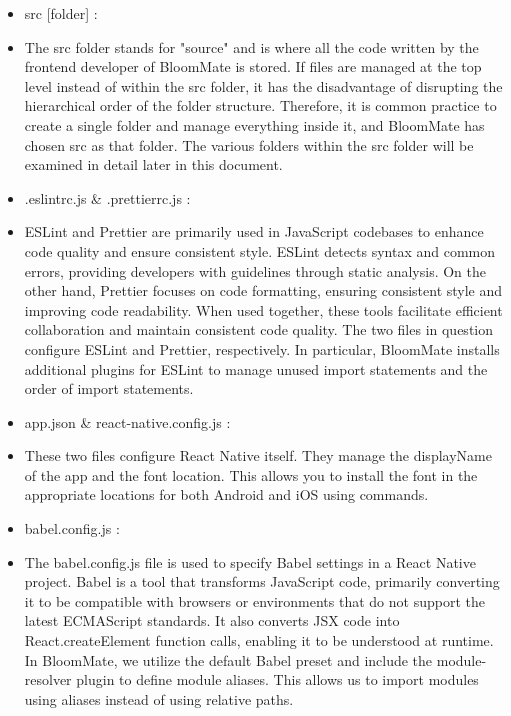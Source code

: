 \documentclass[conference, a4paper]{IEEEtran}
\begin{document}
\begin{enumerate}
\begin{enumerate}
\begin{itemize}
            \item src [folder] :
            \item[] The src folder stands for "source" and is where all the code written by the frontend developer of BloomMate is stored. If files are managed at the top level instead of within the src folder, it has the disadvantage of disrupting the hierarchical order of the folder structure. Therefore, it is common practice to create a single folder and manage everything inside it, and BloomMate has chosen src as that folder. The various folders within the src folder will be examined in detail later in this document. \\

            \item .eslintrc.js \& .prettierrc.js : 
            \item[]  ESLint and Prettier are primarily used in JavaScript codebases to enhance code quality and ensure consistent style. ESLint detects syntax and common errors, providing developers with guidelines through static analysis. On the other hand, Prettier focuses on code formatting, ensuring consistent style and improving code readability. When used together, these tools facilitate efficient collaboration and maintain consistent code quality. The two files in question configure ESLint and Prettier, respectively. In particular, BloomMate installs additional plugins for ESLint to manage unused import statements and the order of import statements. \\

            \item app.json \& react-native.config.js : 
            \item[]  These two files configure React Native itself. They manage the displayName of the app and the font location. This allows you to install the font in the appropriate locations for both Android and iOS using commands.\\

            \item babel.config.js :
            \item[] The babel.config.js file is used to specify Babel settings in a React Native project. Babel is a tool that transforms JavaScript code, primarily converting it to be compatible with browsers or environments that do not support the latest ECMAScript standards. It also converts JSX code into React.createElement function calls, enabling it to be understood at runtime. In BloomMate, we utilize the default Babel preset and include the module-resolver plugin to define module aliases. This allows us to import modules using aliases instead of using relative paths.\\


\end{itemize}
\end{enumerate}
\end{enumerate}
\end{document}
